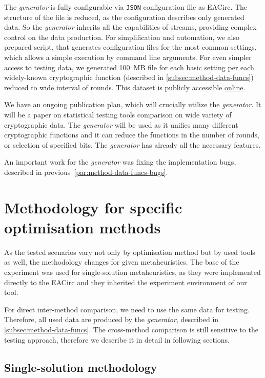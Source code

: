 \documentclass[
    digital,    %
    oneside,    %
    color,
    11pt,
    nocover,
    notable,
    nolof,
    nolot,
]{fithesis3}
\begin{document}
The \textit{generator} is fully configurable via \texttt{JSON} configuration file as EACirc. The structure of the file is reduced, as the configuration describes only generated data. So the \textit{generator} inherits all the capabilities of streams, providing complex control on the data production. For simplification and automation, we also prepared script, that generates configuration files for the most common settings, which allows a simple execution by command line arguments. For even simpler access to testing data, we generated 100~MB file for each basic setting per each widely-known cryptographic function (described in \cref{subsec:method-data-funcs}) reduced to wide interval of rounds. This dataset is publicly accessible \href{https://drive.google.com/drive/folders/0B5Z1zst5NzwXQmFKaXgxREJWNk0?usp=sharing}{online}.

We have an ongoing publication plan, which will crucially utilize the \textit{generator}. It will be a paper on statistical testing tools comparison on wide variety of cryptographic data. The \textit{generator} will be used as it unifies many different cryptographic functions and it can reduce the functions in the number of rounds, or selection of specified bits. The \textit{generator} has already all the necessary features.

An important work for the \textit{generator} was fixing the implementation bugs, described in previous~\cref{par:method-data-funcs-bugs}.


\section{Methodology for specific optimisation methods}
\label{sec:method-spec}

As the tested scenarios vary not only by optimisation method but by used tools as well, the methodology changes for given metaheuristics. The base of the experiment was used for single-solution metaheuristics, as they were implemented directly to the EACirc and they inherited the experiment environment of our tool.

For direct inter-method comparison, we need to use the same data for testing. Therefore, all used data are produced by the \textit{generator}, described in \cref{subsec:method-data-funcs}. The cross-method comparison is still sensitive to the testing approach, therefore we describe it in detail in following sections.


\subsection{Single-solution methodology}
\label{subsec:method-spec-ss}
\end{document}
